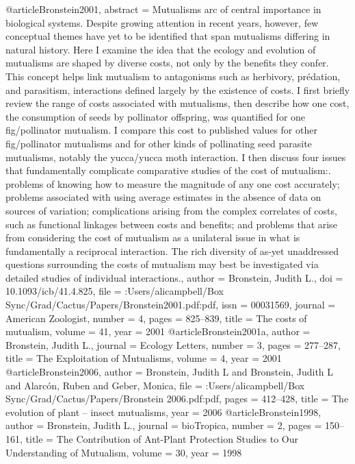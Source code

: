 @article{Bronstein2001,
abstract = {Mutualisms arc of central importance in biological systems. Despite growing attention in recent years, however, few conceptual themes have yet to be identified that span mutualisms differing in natural history. Here I examine the idea that the ecology and evolution of mutualisms are shaped by diverse costs, not only by the benefits they confer. This concept helps link mutualism to antagonisms such as herbivory, pr{\'{e}}dation, and parasitism, interactions defined largely by the existence of costs. I first briefly review the range of costs associated with mutualisms, then describe how one cost, the consumption of seeds by pollinator offspring, was quantified for one fig/pollinator mutualism. I compare this cost to published values for other fig/pollinator mutualisms and for other kinds of pollinating seed parasite mutualisms, notably the yucca/yucca moth interaction. I then discuss four issues that fundamentally complicate comparative studies of the cost of mutualism:. problems of knowing how to measure the magnitude of any one cost accurately; problems associated with using average estimates in the absence of data on sources of variation; complications arising from the complex correlates of costs, such as functional linkages between costs and benefits; and problems that arise from considering the cost of mutualism as a unilateral issue in what is fundamentally a reciprocal interaction. The rich diversity of as-yet unaddressed questions surrounding the costs of mutualism may best be investigated via detailed studies of individual interactions.},
author = {Bronstein, Judith L.},
doi = {10.1093/icb/41.4.825},
file = {:Users/alicampbell/Box Sync/Grad/Cactus/Papers/Bronstein2001.pdf:pdf},
issn = {00031569},
journal = {American Zoologist},
number = {4},
pages = {825--839},
title = {{The costs of mutualism}},
volume = {41},
year = {2001}
}
@article{Bronstein2001a,
author = {Bronstein, Judith L.},
journal = {Ecology Letters},
number = {3},
pages = {277--287},
title = {{The Exploitation of Mutualisms}},
volume = {4},
year = {2001}
}
@article{Bronstein2006,
author = {Bronstein, Judith L and Bronstein, Judith L and Alarc{\'{o}}n, Ruben and Geber, Monica},
file = {:Users/alicampbell/Box Sync/Grad/Cactus/Papers/Bronstein 2006.pdf:pdf},
pages = {412--428},
title = {{The evolution of plant – insect mutualisms}},
year = {2006}
}
@article{Bronstein1998,
author = {Bronstein, Judith L.},
journal = {bioTropica},
number = {2},
pages = {150--161},
title = {{The Contribution of Ant-Plant Protection Studies to Our Understanding of Mutualism}},
volume = {30},
year = {1998}
}
